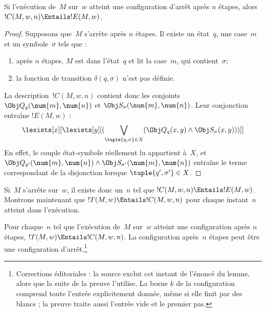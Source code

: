 \documentclass[../../../include/open-logic-section]{subfiles}
\begin{document}
\begin{lem}
Si l'exécution de~$M$ sur~$w$ atteint une configuration d'arrêt
après $n$ étapes, alors $!C(M,w,n)\Entails !E(M,w)$.
\end{lem}

\begin{proof}
Supposons que~$M$ s'arrête après $n$ étapes. Il existe un état~$q$,
une case~$m$ et un symbole~$\sigma$ tels que :
\begin{enumerate}
\item après $n$ étapes, $M$ est dans l'état~$q$ et lit la case~$m$,
  qui contient~$\sigma$;
\item la fonction de transition $\delta(q,\sigma)$ n'est pas définie.
\end{enumerate}
La description~$!C(M,w,n)$ contient donc les conjoints
$\Obj Q_q(\num{m},\num{n})$ et
$\Obj S_\sigma(\num{m},\num{n})$. Leur conjonction entraîne
$!E(M,w)$ :
\[
\lexists[x][\lexists[y][(\bigvee_{\tuple{q,\sigma}\in X}
  (\Obj Q_q(x,y)\land\Obj S_\sigma(x,y)))]]
\]
En effet, le couple état-symbole réellement lu appartient à~$X$,
et $\Obj Q_{q'}(\num{m},\num{n})\land
\Obj S_{\sigma'}(\num{m},\num{n})$ entraîne le terme correspondant
de la disjonction lorsque $\tuple{q',\sigma'}\in X$.
\end{proof}

\begin{explain}
Si~$M$ s'arrête sur~$w$, il existe donc un~$n$ tel que
$!C(M,w,n)\Entails !E(M,w)$. Montrons maintenant que
$!T(M,w)\Entails !C(M,w,n)$ pour chaque instant~$n$ atteint
dans l'exécution.
\end{explain}

\begin{lem}
Pour chaque~$n$ tel que l'exécution de~$M$ sur~$w$ atteint une
configuration après $n$ étapes, $!T(M,w)\Entails !C(M,w,n)$.
La configuration après~$n$ étapes peut être une configuration d'arrêt.\footnote{Corrections éditoriales : la source exclut cet instant de l'énoncé du lemme, alors que la suite de la preuve l'utilise. La borne $k$ de la configuration comprend toute l'entrée explicitement donnée, même si elle finit par des blancs ; la preuve traite aussi l'entrée vide et le premier pas.}
\end{lem}
\end{document}
